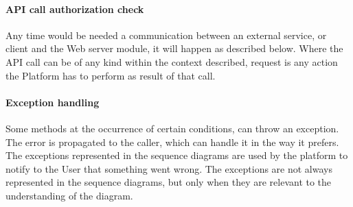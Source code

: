 \paragraph*{API call authorization check} \label{reff:authcheck}
Any time would be needed a communication between an external service, or client and the Web server module, it will happen as described below.
Where the API call can be of any kind within the context described, request is any action the Platform has to perform as result of that call.
\paragraph*{Exception handling}
Some methods at the occurrence of certain conditions, can throw an exception. The error is propagated to the caller, which can handle it in the way it prefers. The exceptions represented in the sequence diagrams are used by the platform to notify
to the User that something went wrong. The exceptions are not always represented in the sequence diagrams, but only when they are relevant to the understanding of the diagram.

